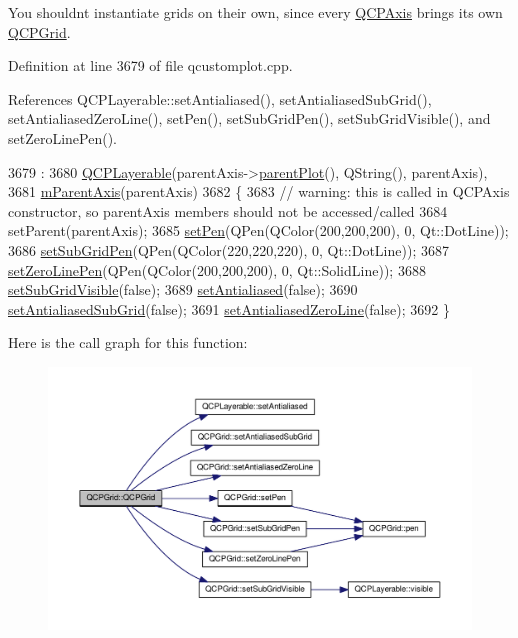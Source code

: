 You shouldn\textquotesingle{}t instantiate grids on their own, since every \hyperlink{class_q_c_p_axis}{Q\+C\+P\+Axis} brings its own \hyperlink{class_q_c_p_grid}{Q\+C\+P\+Grid}. 

Definition at line 3679 of file qcustomplot.\+cpp.



References Q\+C\+P\+Layerable\+::set\+Antialiased(), set\+Antialiased\+Sub\+Grid(), set\+Antialiased\+Zero\+Line(), set\+Pen(), set\+Sub\+Grid\+Pen(), set\+Sub\+Grid\+Visible(), and set\+Zero\+Line\+Pen().


\begin{DoxyCode}
3679                                     :
3680   \hyperlink{class_q_c_p_layerable_a74c0fa237f29bf0e49565013fc5d1ec0}{QCPLayerable}(parentAxis->\hyperlink{class_q_c_p_layerable_ab7e0e94461566093d36ffc0f5312b109}{parentPlot}(), QString(), parentAxis),
3681   \hyperlink{class_q_c_p_grid_a9a8a76731e6e737b65b929fd1995cc88}{mParentAxis}(parentAxis)
3682 \{
3683   \textcolor{comment}{// warning: this is called in QCPAxis constructor, so parentAxis members should not be accessed/called}
3684   setParent(parentAxis);
3685   \hyperlink{class_q_c_p_grid_aa05ab9816ffb440908171e45e833b593}{setPen}(QPen(QColor(200,200,200), 0, Qt::DotLine));
3686   \hyperlink{class_q_c_p_grid_a9edd3593f384d1f0b0202a39cef4453d}{setSubGridPen}(QPen(QColor(220,220,220), 0, Qt::DotLine));
3687   \hyperlink{class_q_c_p_grid_a209f40fdb252397b418b82d3494d8ea0}{setZeroLinePen}(QPen(QColor(200,200,200), 0, Qt::SolidLine));
3688   \hyperlink{class_q_c_p_grid_ad4ad6bf714ec45e08845456355a1b700}{setSubGridVisible}(\textcolor{keyword}{false});
3689   \hyperlink{class_q_c_p_layerable_a4fd43e89be4a553ead41652565ff0581}{setAntialiased}(\textcolor{keyword}{false});
3690   \hyperlink{class_q_c_p_grid_a5692310ba183721a413d60951407d114}{setAntialiasedSubGrid}(\textcolor{keyword}{false});
3691   \hyperlink{class_q_c_p_grid_a3cc6d54647393ee71afb6da56af07aa4}{setAntialiasedZeroLine}(\textcolor{keyword}{false});
3692 \}
\end{DoxyCode}


Here is the call graph for this function\+:\nopagebreak
\begin{figure}[H]
\begin{center}
\leavevmode
\includegraphics[width=350pt]{class_q_c_p_grid_acd1cdd2909625388a13048b698494a17_cgraph}
\end{center}
\end{figure}




